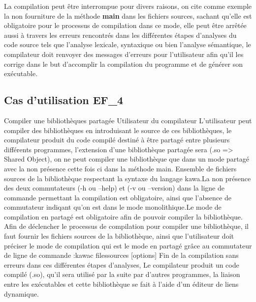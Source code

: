 {                                                %
  
}{} %
{La compilation peut être interrompue pour divers raisons, on cite comme exemple la non fourniture de la méthode \textbf {main} dans les fichiers sources, sachant qu'elle est obligatoire pour le processus de compilation dans ce mode, elle peut être arrêtée aussi à travers les erreurs rencontrés dans les différentes étapes d'analyses du code source  tels que l'analyse lexicale, syntaxique ou bien l'analyse sémantique, le compilateur doit renvoyer des messages d'erreurs pour l'utilisateur afin qu'il les corrige dans le but d'accomplir la compilation du programme et de générer son exécutable. } %


\subsection{Cas d'utilisation EF\_4}
\fiche
{Compiler une bibliothèques partagée}                      %
{Utilisateur du compilateur}                               %
{                                                %
    L'utilisateur peut compiler des bibliothèques en introduisant le source de ces bibliothèques, le compilateur produit du code compilé destiné à être partagé entre plusieurs différents programmes, l'extension d'une bibliothèque partagée sera (.so => Shared Object), on ne peut compiler une bibliothèque que dans un mode partagé avec la non présence cette fois ci dans la méthode main.      
}
{
  Ensemble de fichiers sources de la bibliothèque respectant la syntaxe du langage kawa.La non présence des deux commutateurs (-h ou --help) et (-v ou --version) dans la ligne de commande permettant la compilation est obligatoire, ainsi que l'absence de commutateur indiqant qu'on est dans le mode monolithique.Le mode de compilation en partagé
est obligatoire afin de pouvoir compiler la bibliothèque.}                                                %
{
Afin de déclencher le processus de compilation pour compiler une bibliothèque, il faut fournir les fichiers sources de la bibliothèque, ainsi que l'utilisateur doit préciser le mode de compilation qui est le mode en partagé grâce au commutateur de ligne de commande :kawac filessources [options]} %
{Fin de la compilation sans erreurs dans ces différentes étapes d'analyses, Le compilateur produit un code compilé (.so), qu'il sera utilisé par la suite par d'autres programmes, la liaison entre les exécutables et cette bibliothèque se fait à l'aide d'un éditeur de liens dynamique.} %
